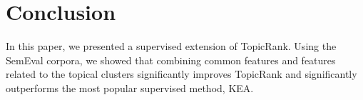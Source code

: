 \section{Conclusion}%
\label{sec:conclusion_and_future_work}
  In this paper, we presented a supervised extension of TopicRank. Using the
  SemEval corpora, we showed that combining common features and features related
  to the topical clusters significantly improves TopicRank and significantly
  outperforms the most popular supervised method, KEA.


